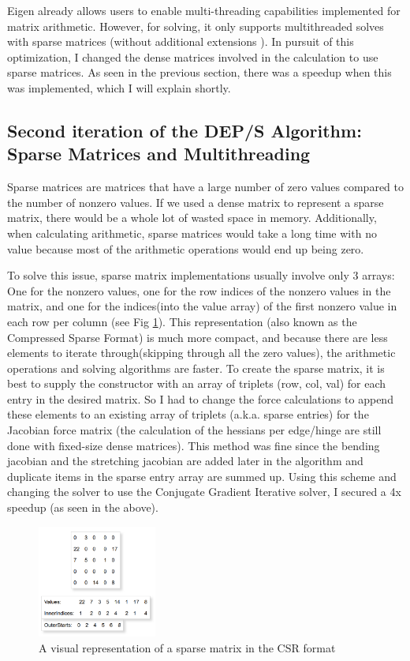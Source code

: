 \documentclass[letterpaper, 10 pt, conference]{ieeeconf}  %
\begin{document}
Eigen already allows users to enable multi-threading capabilities implemented for matrix arithmetic. However, for solving, it only supports multithreaded solves with sparse matrices (without additional extensions \cite{eigen_library}). In pursuit of this optimization, I changed the dense matrices involved in the calculation to use sparse matrices. As seen in the previous section, there was a speedup when this was implemented, which I will explain shortly. 

\subsection{Second iteration of the DEP/S Algorithm: Sparse Matrices and Multithreading}
Sparse matrices are matrices that have a large number of zero values compared to the number of nonzero values. If we used a dense matrix to represent a sparse matrix, there would be a whole lot of wasted space in memory. Additionally, when calculating arithmetic, sparse matrices would take a long time with no value because most of the arithmetic operations would end up being zero. 


To solve this issue, sparse matrix implementations usually involve only 3 arrays: One for the nonzero values, one for the row indices of the nonzero values in the matrix, and one for the indices(into the value array) of the first nonzero value in each row per column (see Fig \ref{fig:sparse_matrix}). This representation (also known as the Compressed Sparse Format) is much more compact, and because there are less elements to iterate through(skipping through all the zero values), the arithmetic operations and solving algorithms are faster. To create the sparse matrix, it is best to supply the constructor with an array of triplets (row, col, val) for each entry in the desired matrix. So I had to change the force calculations to append these elements to an existing array of triplets (a.k.a. sparse entries) for the Jacobian force matrix (the calculation of the hessians per edge/hinge are still done with fixed-size dense matrices). This method was fine since the bending jacobian and the stretching jacobian are added later in the algorithm and duplicate items in the sparse entry array are summed up. Using this scheme and changing the solver to use the Conjugate Gradient Iterative solver, I secured a 4x speedup (as seen in the above).

\begin{figure}
        \centering
        \includegraphics[width=0.35\textwidth]{spmat.PNG}
        \caption{A visual representation of a sparse matrix in the CSR format} \label{fig:sparse_matrix}
\end{figure}
\end{document}
